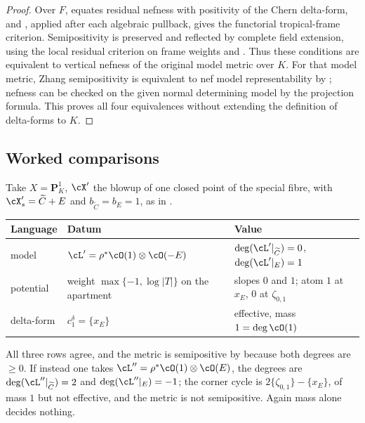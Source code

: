 \begin{proof}
Over $F$,  equates residual
nefness with positivity of the Chern delta-form, and
, applied after each algebraic
pullback, gives the functorial tropical-frame criterion.
Semipositivity is preserved and reflected by complete field extension,
using the local residual criterion on frame weights and
\cite[Proposition~7.6(2')]{GJR26}.  Thus these conditions are equivalent
to vertical nefness of the original model metric over $K$.  For that model
metric, Zhang semipositivity is equivalent to nef model representability by
; nefness can be checked on the given
normal determining model by the projection formula.  This proves all four
equivalences without extending the definition of delta-forms to $K$.
\end{proof}

\subsection{Worked comparisons}
\label{sec:ch18-model-worked}

\begin{example}
\label{ex:ch18-compare-p1}
Take $X=\mathbf P^1_K$, $\cX'$ the blowup of one closed point of the special
fibre, with $\cX'_s=\widetilde C+E$ and $b_{\widetilde C}=b_E=1$, as in
.
\begin{center}
\small
\begin{tabular}{p{}|p{}|p{}}
\textbf{Language}&\textbf{Datum}&\textbf{Value}\\ \hline
model
 &$\cL'=\rho^*\cO(1)\otimes\cO(-E)$
 &$\deg(\cL'|_{\widetilde C})=0$, $\deg(\cL'|_E)=1$\\
potential
 &weight $\max\{-1,\log|T|\}$ on the apartment
 &slopes $0$ and $1$; atom $1$ at $x_E$, $0$ at $\zeta_{0,1}$\\
delta-form
 &$c_1^\delta=\{x_E\}$
 &effective, mass $1=\deg\cO(1)$\\
\end{tabular}
\end{center}
All three rows agree, and the metric is semipositive by
 because both degrees are $\geq0$.  If instead one
takes $\cL''=\rho^*\cO(1)\otimes\cO(E)$, the degrees are
$\deg(\cL''|_{\widetilde C})=2$ and $\deg(\cL''|_E)=-1$; the corner cycle is
$2\{\zeta_{0,1}\}-\{x_E\}$, of mass $1$ but not effective, and the metric is
not semipositive.  Again mass alone decides nothing.
\end{example}

